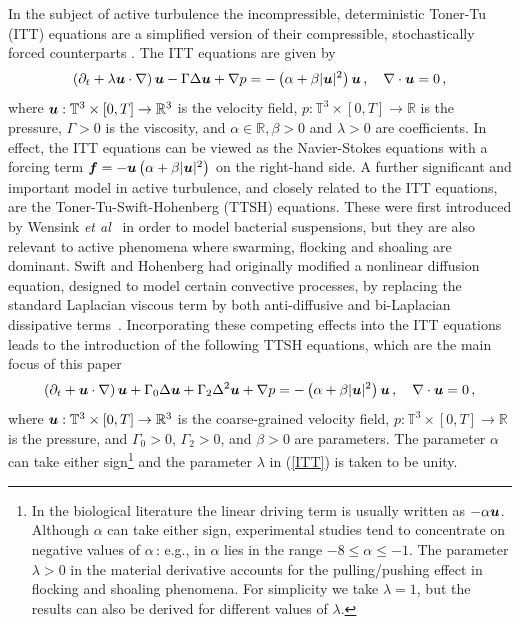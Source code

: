 \documentclass[11pt]{amsart}
\newcommand{\bu}{\mbox{\boldmath$u$}}
\newcommand{\bdf}{\mbox{\boldmath$f$}}
\newcommand{\bel}{\begin{equation}\label}
\newcommand{\ee}{\end{equation}}
\theoremstyle{definition}
\numberwithin{equation}{section}
\numberwithin{equation}{section}
\begin{document}
In the subject of active turbulence \cite{Vicsek1995,TT1995,TTR2005,Rama-Rev-2010,AJC2020,ACJ2022,Rama-Rev-2019,MJR2013} the incompressible, deterministic Toner-Tu (ITT) equations are a simplified version of their compressible, stochastically forced counterparts  \cite{CLT2015,RP2020,KGPP2023}. The ITT equations are given by
\bel{ITT}
\left(\partial_{t} + \lambda\bu\cdot\nabla\right)\bu - \Gamma\Delta\bu + \nabla p = -\left(\alpha + \beta|\bu|^{2}\right)\bu\,, \quad \nabla \cdot \bu = 0\,,
\ee
where $\bu : \mathbb{T}^3 \times [0,T] \rightarrow \mathbb{R}^3$ is the velocity field, $p : \mathbb{T}^3 \times [0,T] \rightarrow \mathbb{R}$ is the pressure, $\Gamma > 0$ is the viscosity, and $\alpha \in \mathbb{R}, \beta > 0$ and $\lambda > 0$ are coefficients. In effect, the ITT equations can be viewed as the Navier-Stokes equations with a forcing term $\bdf = -\bu\left(\alpha + \beta|\bu|^{2}\right)$ on the right-hand side. A further significant and important model in active turbulence, and closely related to the ITT equations, are the Toner-Tu-Swift-Hohenberg (TTSH) equations. These were first introduced by Wensink \textit{et al}~\cite{wensink2012} in order to model bacterial suspensions, but they are also relevant to active phenomena where swarming, flocking and shoaling are dominant. Swift and Hohenberg had originally modified a nonlinear diffusion equation, designed to model certain convective processes, by replacing the standard Laplacian viscous term by both anti-diffusive and bi-Laplacian dissipative terms~\cite{SH1}. Incorporating these competing effects into the ITT equations leads to the introduction of the following TTSH equations, which are the main focus of this paper
\bel{TTSHpde}
\left(\partial_{t} + \bu\cdot\nabla\right)\bu + \Gamma_{0}\Delta\bu + \Gamma_{2}\Delta^{2}\bu + \nabla p
= - \left(\alpha + \beta|\bu|^{2}\right)\bu\,, \quad \nabla \cdot \bu = 0\,,
\ee
where $\bu : \mathbb{T}^3 \times [0,T] \rightarrow \mathbb{R}^3$ is the coarse-grained velocity field, $p : \mathbb{T}^3 \times [0,T] \rightarrow \mathbb{R}$ is the pressure, and $\Gamma_{0} > 0$, $\Gamma_{2} > 0$, and $\beta > 0$ are parameters. The parameter $\alpha$ can take either sign\footnote{In the biological literature the linear driving term is usually written as $-\alpha\bu$. Although $\alpha$ can take either sign, experimental studies tend to concentrate on negative values of $\alpha$\,: e.g., in \cite{SSR1} $\alpha$ lies in the range $-8 \leq \alpha \leq -1$. The parameter $\lambda>0$ in the material derivative accounts for the pulling/pushing effect in flocking and shoaling phenomena. For simplicity we take $\lambda=1$, but the results can also be derived for different values of $\lambda$.} and the parameter $\lambda$ in (\ref{ITT}) is taken to be unity. 
\end{document}

